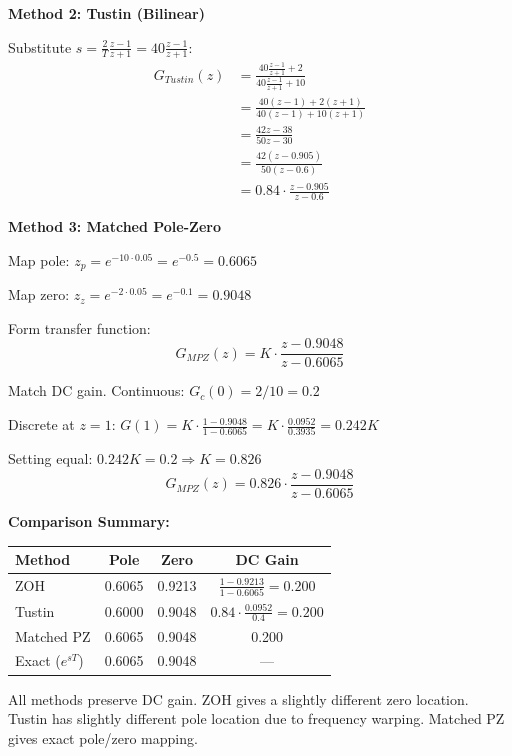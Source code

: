 \begin{example}
\textbf{Method 2: Tustin (Bilinear)}

Substitute $s = \frac{2}{T}\frac{z-1}{z+1} = 40\frac{z-1}{z+1}$:
\begin{align}
G_{Tustin}(z) &= \frac{40\frac{z-1}{z+1} + 2}{40\frac{z-1}{z+1} + 10} \\
&= \frac{40(z-1) + 2(z+1)}{40(z-1) + 10(z+1)} \\
&= \frac{42z - 38}{50z - 30} \\
&= \frac{42(z - 0.905)}{50(z - 0.6)} \\
&= 0.84 \cdot \frac{z - 0.905}{z - 0.6}
\end{align}

\textbf{Method 3: Matched Pole-Zero}

Map pole: $z_p = e^{-10 \cdot 0.05} = e^{-0.5} = 0.6065$

Map zero: $z_z = e^{-2 \cdot 0.05} = e^{-0.1} = 0.9048$

Form transfer function:
\begin{equation}
G_{MPZ}(z) = K \cdot \frac{z - 0.9048}{z - 0.6065}
\end{equation}

Match DC gain. Continuous: $G_c(0) = 2/10 = 0.2$

Discrete at $z = 1$: $G(1) = K \cdot \frac{1 - 0.9048}{1 - 0.6065} = K \cdot \frac{0.0952}{0.3935} = 0.242K$

Setting equal: $0.242K = 0.2 \Rightarrow K = 0.826$
\begin{equation}
G_{MPZ}(z) = 0.826 \cdot \frac{z - 0.9048}{z - 0.6065}
\end{equation}

\textbf{Comparison Summary:}

\begin{center}
\begin{tabular}{lccc}
\toprule
\textbf{Method} & \textbf{Pole} & \textbf{Zero} & \textbf{DC Gain} \\
\midrule
ZOH & 0.6065 & 0.9213 & $\frac{1-0.9213}{1-0.6065} = 0.200$ \\
Tustin & 0.6000 & 0.9048 & $0.84 \cdot \frac{0.0952}{0.4} = 0.200$ \\
Matched PZ & 0.6065 & 0.9048 & 0.200 \\
Exact ($e^{sT}$) & 0.6065 & 0.9048 & --- \\
\bottomrule
\end{tabular}
\end{center}

All methods preserve DC gain. ZOH gives a slightly different zero location. Tustin has slightly different pole location due to frequency warping. Matched PZ gives exact pole/zero mapping.
\end{example}

